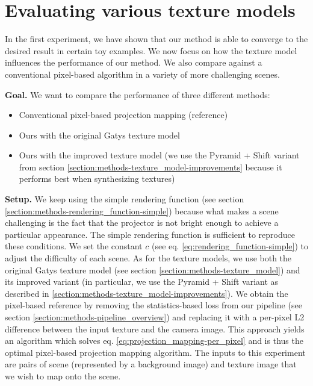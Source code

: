 \section{Evaluating various texture models}
\label{section:results-experiments-02}

In the first experiment, we have shown that our method is able to converge to the desired result in certain toy examples. We now focus on how the texture model influences the performance of our method. We also compare against a conventional pixel-based algorithm in a variety of more challenging scenes.

\textbf{Goal.} We want to compare the performance of three different methods:

\begin{itemize}
    \item Conventional pixel-based projection mapping (reference)
    \item Ours with the original Gatys texture model
    \item Ours with the improved texture model (we use the Pyramid + Shift variant from section \ref{section:methods-texture_model-improvements} because it performs best when synthesizing textures)
\end{itemize}

\textbf{Setup.} We keep using the simple rendering function (see section \ref{section:methods-rendering_function-simple}) because what makes a scene challenging is the fact that the projector is not bright enough to achieve a particular appearance. The simple rendering function is sufficient to reproduce these conditions. We set the constant \(c\) (see eq. \ref{eq:rendering_function-simple}) to adjust the difficulty of each scene. As for the texture models, we use both the original Gatys texture model (see section \ref{section:methods-texture_model}) and its improved variant (in particular, we use the Pyramid + Shift variant as described in \ref{section:methods-texture_model-improvements}). We obtain the pixel-based reference by removing the statistics-based loss from our pipeline (see section \ref{section:methods-pipeline_overview}) and replacing it with a per-pixel L2 difference between the input texture and the camera image. This approach yields an algorithm which solves eq. \ref{eq:projection_mapping-per_pixel} and is thus the optimal pixel-based projection mapping algorithm. The inputs to this experiment are pairs of scene (represented by a background image) and texture image that we wish to map onto the scene.

